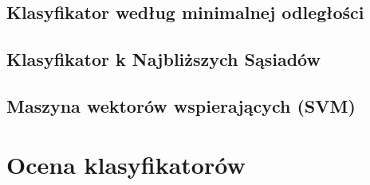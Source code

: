 	
\subsection{Klasyfikator według minimalnej odległości}

	
\subsection{Klasyfikator k Najbliższych Sąsiadów}


\subsection{Maszyna wektorów wspierających (SVM)}
	
	
\section{Ocena klasyfikatorów}


